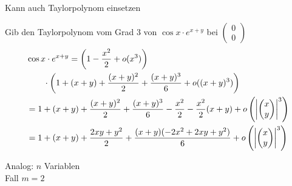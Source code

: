 \begin{bem}
	Kann auch Taylorpolynom einsetzen
\end{bem}
\begin{bsp*}
	Gib den Taylorpolynom vom Grad 3 von $\cos x \cdot e^{x+y}$ bei $\begin{pmatrix} 0 \\ 0 \end{pmatrix}$
	\[ \begin{split}
		&\cos x \cdot e^{x+y} = \left( 1 - \frac{x^2}{2} + o( x^3 ) \right) \\
			&\qquad\cdot \left( 1 + (x+ y) + \frac{(x+y)^2}{2} + \frac{(x+y)^3}{6} + o((x+y)^3) \right) \\
			&= 1 + (x+y) + \frac{(x+y)^2}{2} + \frac{(x+y)^3}{6} - \frac{x^2}{2} - \frac{x^2}{2} (x+y) + o\left( \abs{\begin{pmatrix} x \\ y \end{pmatrix}}^3 \right) \\
			&= 1 + (x+y) + \frac{2xy + y^2}{2} + \frac{(x+y)(-2x^2 + 2xy + y^2)}{6} + o\left( \abs{\begin{pmatrix} x \\ y \end{pmatrix}}^3 \right)
	\end{split} \]
\end{bsp*}
Analog: $n$ Variablen \\
Fall $m=2$
